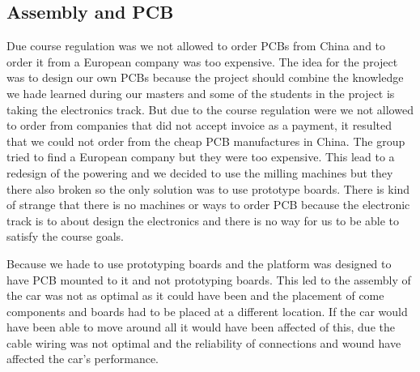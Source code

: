 \documentclass[11pt, titlepage]{article} %
\begin{document}
\subsection{Assembly and PCB}
Due course regulation was we not allowed to order PCBs from China and to order it from a European company was too expensive. 
The idea for the project was to design our own PCBs because the project should combine the knowledge we hade learned during our masters and some of the students in the project is taking the electronics track. But due to the course regulation were we not allowed to order from companies that did not accept invoice as a payment, it resulted that we could not order from the cheap PCB manufactures in China. The group tried to find a European company but they were too expensive. This lead to a redesign of the powering and we decided to use the milling machines but they there also broken so the only solution was to use prototype boards. There is kind of strange that there is no machines or ways to order PCB because the electronic track is to about design the electronics and there is no way for us to be able to satisfy the course goals. 

Because we hade to use prototyping boards and the platform was designed to have PCB mounted to it and not prototyping boards. This led to the assembly of the car was not as optimal as it could have been and the placement of come components and boards had to be placed at a different location. If the car would have been able to move around all it would have been affected of this, due the cable wiring was not optimal and the reliability of connections and wound have affected the car's performance. 


\clearpage
\end{document}
